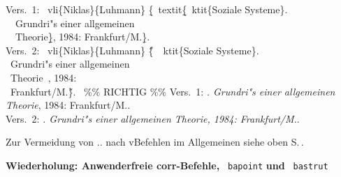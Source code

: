 \documentclass[12pt,a4paper]{article}
\newcommand{\pbs}{\string\ \unskip}
\newcommand{\bs}{\protect\pbs}
\begin{document}
\Doppelbox
{\vspace{-.8ex}
Vers.\string~1: \bs vli\{Niklas\}\{Luhmann\} \b{\{}\bs textit\b{\b{\{}}\bs ktit\{Soziale Systeme\}. 
\\ \ \ Grundri"s einer allgemeinen 
\\ \ \ Theorie\b{\b{\}}}, 1984: Frankfurt/M.\b{\}}.
\\[2.8ex]
Vers.\string~2: \bs vli\{Niklas\}\{Luhmann\} \H{\{}\bs{}\bs ktit\{Soziale Systeme\}. 
\\ \ Grundri"s einer allgemeinen 
\\ \ Theorie\bs{}, 1984: 
\\ \ Frankfurt/M.\H{\}}. \ \%\% RICHTIG \%\%
}
{\vspace{1ex}
Vers.~1:  {\textit{. 
Grundri"s einer allgemeinen 
Theorie}, 1984: Frankfurt/M.}. 
\\[4.1ex]
Vers.~2:  {\itshape{}. 
Grundri"s einer allgemeinen 
Theorie\upshape, 1984: Frankfurt/M.}.
}%


\vfill\noindent
\textsf{Zur Vermeidung von\hspace{.1em} ..\hspace{.1em} 
nach v\fhy Befehlen im Allgemeinen siehe oben S.\,\pageref{v-Ausnahme}.}
\vfill



\newpage\noindent
\textbf{Wiederholung: Anwenderfreie corr-Befehle, }\texttt{\bs bapoint}\textbf{ und }\texttt{\bs bastrut}
\end{document}
